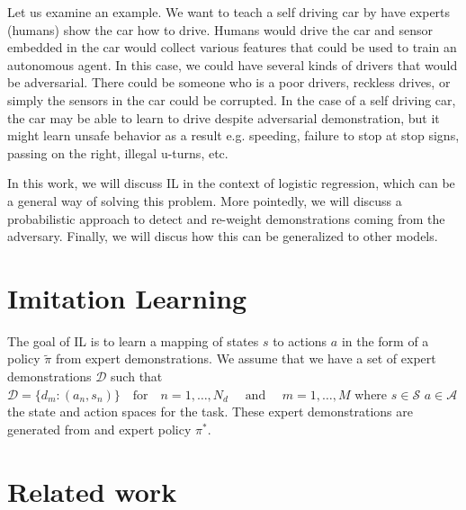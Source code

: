 \documentclass[11pt]{article}
\newcommand{\states}{\mathcal{S}}
\newcommand{\actions}{\mathcal{A}}
\newcommand{\data}{\mathcal{D}}
\begin{document}
Let us examine an example. We want to teach a self driving car by have experts (humans) show the car how to drive. Humans would drive the car and sensor embedded in the car would collect various features that could be used to train an autonomous agent. In this case, we could have several kinds of drivers that would be adversarial. There could be someone who is a poor drivers, reckless drives, or simply the sensors in the car could be corrupted. In the case of a self driving car, the car may be able to learn to drive despite adversarial demonstration, but it might learn unsafe behavior as a result e.g. speeding, failure to stop at stop signs, passing on the right, illegal u-turns, etc.

In this work, we will discuss IL in the context of logistic regression, which can be a general way of solving this problem. More pointedly, we will discuss a probabilistic approach to detect and re-weight demonstrations coming from the adversary. Finally, we will discus how this can be generalized to other models.

\section{Imitation Learning}

\quad The goal of IL is to learn a mapping of states $s$ to actions $a$ in the form of a policy $\widetilde{\pi}$ from expert demonstrations. We assume that we have a set of expert demonstrations $\data$ such that $\data = \{d_{m}: (a_{n}, s_{n})\} \quad \text{for} \quad n = 1,\ldots, N_{d} \quad  \text{ and } \quad  m = 1,\ldots, M$ where $s \in \states$ $a \in \actions$ the state and action spaces for the task. These expert demonstrations are generated from and expert policy $\pi^{\ast}$.

\section{Related work}
\end{document}

